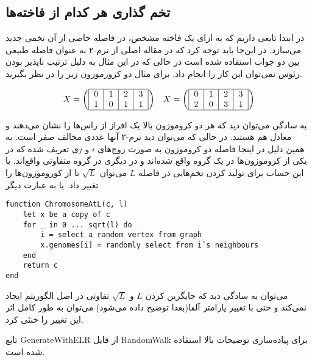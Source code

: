 \documentclass{article}
\begin{document}
\subsection*{تخم‌ گذاری هر کدام از فاخته‌ها}
در ابتدا تابعی داریم که به ازای یک فاخته مشخص، در فاصله خاصی از آن تخمی جدید می‌سازد. در این‌جا باید توجه کرد که در مقاله اصلی از نرم-۲ به عنوان فاصله طبیعی بین دو جواب استفاده شده است در حالی که در این مثال به دلیل ترتیب ناپذیر بودن رئوس نمی‌توان این کار را انجام داد. برای مثال دو کرورموزون زیر را در نظر بگیرید.

\setlength\arraycolsep{20pt}
\[
\begin{array}{cc}
X = \left(
\begin{tabular}{|c|c|c|c|}
\hline
 0 & 1 & 2 & 3\\
 1 &  0 & 1 & 1\\\hline
\end{tabular}
\right)
&
X = \left(
\begin{tabular}{|c|c|c|c|}
\hline
 0 & 1 & 2 & 3\\
 2 &  0 & 3 & 1\\\hline
\end{tabular}
\right)
\end{array}
\]

به سادگی می‌توان دید که هر دو کروموزون بالا یک افراز از راس‌ها را نشان می‌دهند و معادل هم هستند. در حالی که می‌توان دید نرم-۲ آنها عددی مخالف صفر است.
به همین دلیل در اینجا فاصله دو کروموزون به صورت زوج‌های $i$ و $j$ی تعریف شده که در یکی از کروموزون‌ها در یک گروه واقع شده‌اند و در دیگری در گروه‌ متفاوتی واقع‌اند. با این حساب برای تولید کردن تخم‌هایی در فاصله $L$ می‌توان $\sqrt{L}$ تا از کوروموزون‌ها را تغییر داد. یا به عبارت دیگر
\begin{latin}
\begin{lstlisting}[style=lua]
function ChromosomeAtL(c, l)
	let x be a copy of c
	for _ in 0 ... sqrt(l) do
		i = select a random vertex from graph
		x.genomes[i] = randomly select from i`s neighbours
	end
	return c
end
\end{lstlisting}
\end{latin}

می‌توان به سادگی دید که جایگزین کردن $L$ و $\sqrt{L}$ تفاوتی در اصل الگوریتم ایجاد نمی‌کند و حتی با تغییر پارامتر آلفا(بعدا توضیح داده می‌شود) می‌توان به طور کامل اثر این تغییر را خنثی کرد.

تابع GenerateWithELR از فایل RandomWalk برای پیاده‌سازی توضیحات بالا استفاده شده است.
\end{document}
